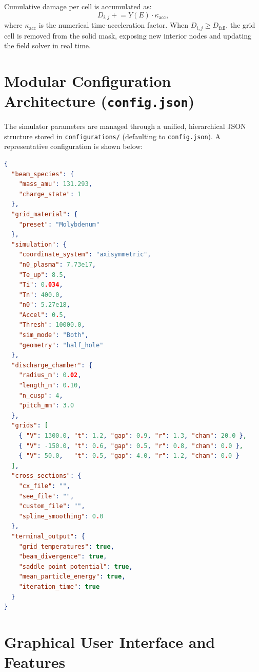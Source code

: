 \documentclass[11pt,a4paper]{article}
\begin{document}
Cumulative damage per cell is accumulated as:
\begin{equation}
    D_{i,j} \mathrel{+}= Y(E) \cdot \kappa_{\mathrm{acc}},
\end{equation}
where $\kappa_{\mathrm{acc}}$ is the numerical time-acceleration factor. When $D_{i,j} \ge D_{\mathrm{fail}}$, the grid cell is removed from the solid mask, exposing new interior nodes and updating the field solver in real time.

\section{Modular Configuration Architecture (\texttt{config.json})}

The simulator parameters are managed through a unified, hierarchical JSON structure stored in \texttt{configurations/} (defaulting to \texttt{config.json}). A representative configuration is shown below:

\begin{lstlisting}[language=json,caption={Standard \texttt{config.json} structure}]
{
  "beam_species": {
    "mass_amu": 131.293,
    "charge_state": 1
  },
  "grid_material": {
    "preset": "Molybdenum"
  },
  "simulation": {
    "coordinate_system": "axisymmetric",
    "n0_plasma": 7.73e17,
    "Te_up": 8.5,
    "Ti": 0.034,
    "Tn": 400.0,
    "n0": 5.27e18,
    "Accel": 0.5,
    "Thresh": 10000.0,
    "sim_mode": "Both",
    "geometry": "half_hole"
  },
  "discharge_chamber": {
    "radius_m": 0.02,
    "length_m": 0.10,
    "n_cusp": 4,
    "pitch_mm": 3.0
  },
  "grids": [
    { "V": 1300.0, "t": 1.2, "gap": 0.9, "r": 1.3, "cham": 20.0 },
    { "V": -150.0, "t": 0.6, "gap": 0.5, "r": 0.8, "cham": 0.0 },
    { "V": 50.0,   "t": 0.5, "gap": 4.0, "r": 1.2, "cham": 0.0 }
  ],
  "cross_sections": {
    "cx_file": "",
    "see_file": "",
    "custom_file": "",
    "spline_smoothing": 0.0
  },
  "terminal_output": {
    "grid_temperatures": true,
    "beam_divergence": true,
    "saddle_point_potential": true,
    "mean_particle_energy": true,
    "iteration_time": true
  }
}
\end{lstlisting}

\section{Graphical User Interface and Features}
\end{document}
